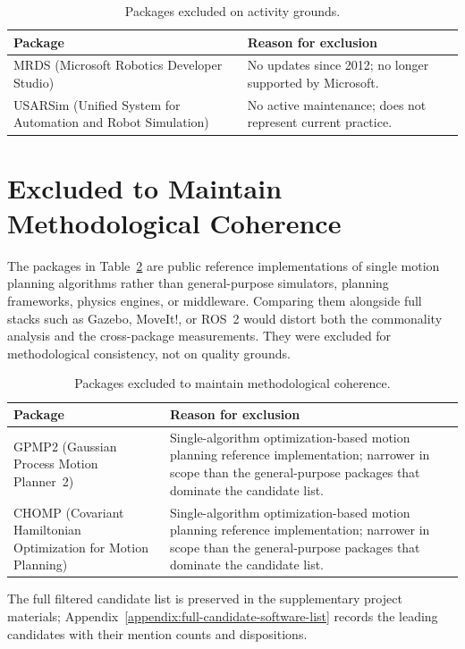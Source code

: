 \begin{table}[H]
\centering
\caption{Packages excluded on activity grounds.}
\label{tab:excluded-inactive}
\small
\begin{tabular}{@{}p{3.5cm}p{9.5cm}@{}}
\toprule
\textbf{Package} & \textbf{Reason for exclusion} \\
\midrule
MRDS (Microsoft Robotics Developer Studio) & No updates since 2012; no longer supported by Microsoft. \\
USARSim (Unified System for Automation and Robot Simulation) & No active maintenance; does not represent current practice. \\
\bottomrule
\end{tabular}
\end{table}

\section*{Excluded to Maintain Methodological Coherence}

The packages in Table~\ref{tab:excluded-scope} are public reference implementations of single motion planning algorithms rather than general-purpose simulators, planning frameworks, physics engines, or middleware. Comparing them alongside full stacks such as Gazebo, MoveIt!, or ROS~2 would distort both the commonality analysis and the cross-package measurements. They were excluded for methodological consistency, not on quality grounds.

\begin{table}[H]
\centering
\caption{Packages excluded to maintain methodological coherence.}
\label{tab:excluded-scope}
\small
\begin{tabular}{@{}p{3.5cm}p{9.5cm}@{}}
\toprule
\textbf{Package} & \textbf{Reason for exclusion} \\
\midrule
GPMP2 (Gaussian Process Motion Planner~2) & Single-algorithm optimization-based motion planning reference implementation; narrower in scope than the general-purpose packages that dominate the candidate list. \\
CHOMP (Covariant Hamiltonian Optimization for Motion Planning) & Single-algorithm optimization-based motion planning reference implementation; narrower in scope than the general-purpose packages that dominate the candidate list. \\
\bottomrule
\end{tabular}
\end{table}

The full filtered candidate list is preserved in the supplementary project materials; Appendix~\ref{appendix:full-candidate-software-list} records the leading candidates with their mention counts and dispositions.
